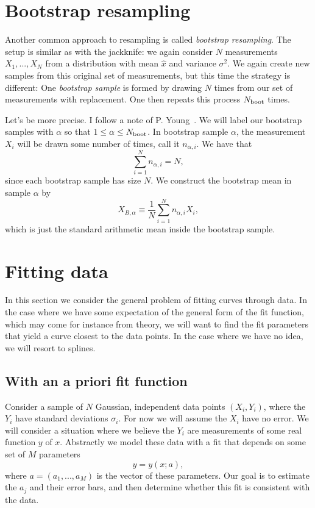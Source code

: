\section{Bootstrap resampling}

Another common approach to resampling is called {\it bootstrap resampling}.
The setup is similar as with the jackknife: we again consider
$N$ measurements $X_1,...,X_N$ from a distribution with mean
$\hat{x}$ and variance $\sigma^2$. We again create new samples from
this original set of measurements, but this time the strategy is different:
One {\it bootstrap sample} is formed by drawing $N$ times from our set
of measurements with replacement. One then repeats this process
$N_{\text{boot}}$ times.

Let's be more precise. I follow a note of P. Young~\cite{youngBootstrap}.
We will label our bootstrap samples with $\alpha$ so that
$1\leq\alpha\leq N_{\text{boot}}$. In bootstrap sample $\alpha$, the measurement
$X_i$ will be drawn some number of times, call it $n_{\alpha,i}$.
We have that
\begin{equation}
\sum_{i=1}^Nn_{\alpha,i}=N,
\end{equation}
since each bootstrap sample has size $N$. We construct the bootstrap mean in
sample $\alpha$ by
\begin{equation}
X_{B,\alpha}\equiv\frac{1}{N}\sum_{i=1}^Nn_{\alpha,i}X_i,
\end{equation}
which is just the standard arithmetic mean inside the bootstrap sample.


\section{Fitting data}

In this section we consider the general problem of fitting curves through data.
In the case where we have some expectation of the general form of the fit
function, which may come for instance from theory, we will want to find the fit
parameters that yield a curve closest to the data points. In the case where we
have no idea, we will resort to splines.

\subsection{With an a priori fit function}

Consider a sample of $N$ Gaussian, independent data points $(X_i,Y_i)$,
where the $Y_i$ have standard deviations $\sigma_i$. For now we will
assume the $X_i$ have no error. We will consider a situation where
we believe the $Y_i$ are measurements of some real function $y$ of $x$.
Abstractly we model these data with a fit that depends on some set
of $M$ parameters
\begin{equation}
  y=y(x;a),
\end{equation}
where $a=(a_1,...,a_M)$ is the vector of these parameters. Our goal
is to estimate the $a_j$ and their error bars, and then determine whether
this fit is consistent with the data.

